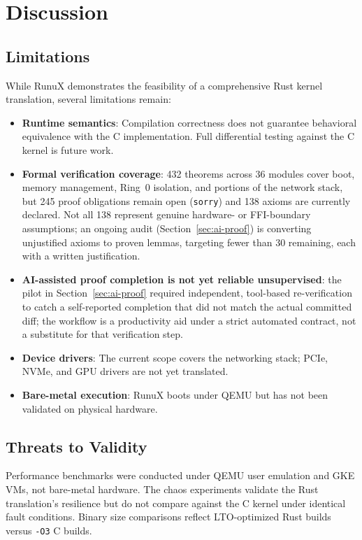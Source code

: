 \documentclass[sigconf,nonacm=false]{acmart}
\begin{document}
\section{Discussion}
\label{sec:discussion}

\subsection{Limitations}
While RunuX demonstrates the feasibility of a comprehensive Rust kernel translation, several limitations remain:
\begin{itemize}
    \item \textbf{Runtime semantics}: Compilation correctness does not guarantee behavioral equivalence with the C implementation. Full differential testing against the C kernel is future work.
    \item \textbf{Formal verification coverage}: 432 theorems across 36 modules cover boot, memory management, Ring~0 isolation, and portions of the network stack, but 245 proof obligations remain open (\texttt{sorry}) and 138 axioms are currently declared. Not all 138 represent genuine hardware- or FFI-boundary assumptions; an ongoing audit (Section~\ref{sec:ai-proof}) is converting unjustified axioms to proven lemmas, targeting fewer than 30 remaining, each with a written justification.
    \item \textbf{AI-assisted proof completion is not yet reliable unsupervised}: the pilot in Section~\ref{sec:ai-proof} required independent, tool-based re-verification to catch a self-reported completion that did not match the actual committed diff; the workflow is a productivity aid under a strict automated contract, not a substitute for that verification step.
    \item \textbf{Device drivers}: The current scope covers the networking stack; PCIe, NVMe, and GPU drivers are not yet translated.
    \item \textbf{Bare-metal execution}: RunuX boots under QEMU but has not been validated on physical hardware.
\end{itemize}

\subsection{Threats to Validity}
Performance benchmarks were conducted under QEMU user emulation and GKE VMs, not bare-metal hardware. The chaos experiments validate the Rust translation's resilience but do not compare against the C kernel under identical fault conditions. Binary size comparisons reflect LTO-optimized Rust builds versus \texttt{-O3} C builds.
\end{document}
